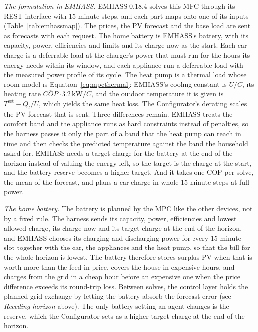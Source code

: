 \documentclass[12pt,a4paper]{report}
\begin{document}
\textit{The formulation in EMHASS.} EMHASS 0.18.4 solves this MPC
through its REST interface with 15-minute steps, and each part maps onto
one of its inputs (Table~\ref{tab:emhassmap}). The prices, the PV forecast and the base load are
sent as forecasts with each request. The home battery is EMHASS's
battery, with its capacity, power, efficiencies and limits and its
charge now as the start. Each car charge is a deferrable load at the
charger's power that must run for the hours its energy needs within its
window, and each appliance run a deferrable load with the measured
power profile of its cycle. The heat pump is a thermal load whose room
model is Equation~\ref{eq:mpcthermal}: EMHASS's cooling constant is
$U/C$, its heating rate $\overline{\mathit{COP}}\cdot 3.2\,\mathrm{kW}/C$,
and the outdoor temperature it is given is
$T^{\mathrm{set}} - Q_t/U$, which yields the same heat loss. The
Configurator's derating scales the PV forecast that is sent. Three
differences remain. EMHASS treats the comfort band and the appliance
runs as hard constraints instead of penalties, so the harness passes it
only the part of a band that the heat pump can reach in time and then
checks the predicted temperature against the band the household asked
for. EMHASS needs a target charge for the battery at the end of the
horizon instead of valuing the energy left, so the target is the charge
at the start, and the battery reserve becomes a higher target. And it
takes one COP per solve, the mean of the forecast, and plans a car
charge in whole 15-minute steps at full power.

\textit{The home battery.} The battery is planned by the MPC like the
other devices, not by a fixed rule. The harness sends its capacity,
power, efficiencies and lowest allowed charge, its charge now and its
target charge at the end of the horizon, and EMHASS chooses its
charging and discharging power for every 15-minute slot together with
the car, the appliances and the heat pump, so that the bill for the
whole horizon is lowest. The battery therefore stores surplus PV when
that is worth more than the feed-in price, covers the house in
expensive hours, and charges from the grid in a cheap hour before an
expensive one when the price difference exceeds its round-trip loss.
Between solves, the control layer holds the planned grid exchange by
letting the battery absorb the forecast error (see \textit{Receding
horizon} above). The only battery setting an agent changes is the
reserve, which the Configurator sets as a higher target charge at the
end of the horizon.
\end{document}
